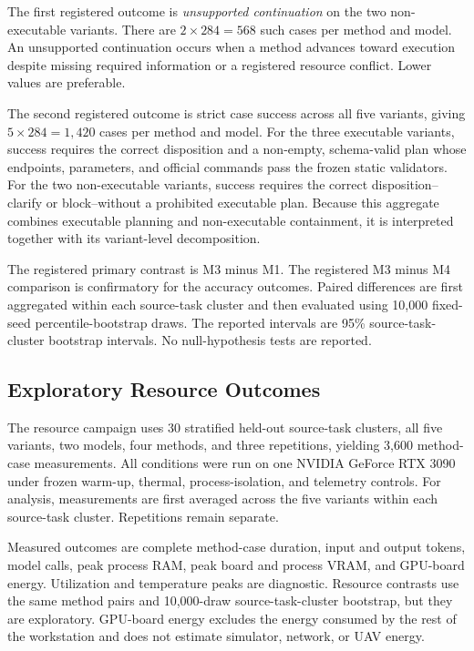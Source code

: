 \documentclass{article}
\newcommand{\Mone}{\textsc{M1}\xspace}
\newcommand{\Mthree}{\textsc{M3}\xspace}
\newcommand{\Mfour}{\textsc{M4}\xspace}
\begin{document}
The first registered outcome is \emph{unsupported continuation} on the two
non-executable variants. There are $2\times284=568$ such cases per method and
model. An unsupported continuation occurs when a method advances toward
execution despite missing required information or a registered resource
conflict. Lower values are preferable.

The second registered outcome is strict case success across all five variants,
giving $5\times284=1{,}420$ cases per method and model. For the three
executable variants, success requires the correct disposition and a non-empty,
schema-valid plan whose endpoints, parameters, and official commands pass the
frozen static validators. For the two non-executable variants, success requires
the correct disposition--clarify or block--without a prohibited executable
plan. Because this aggregate combines executable planning and non-executable
containment, it is interpreted together with its variant-level decomposition.

The registered primary contrast is \Mthree{} minus \Mone. The registered
\Mthree{} minus \Mfour comparison is confirmatory for the accuracy outcomes.
Paired differences are first aggregated within each source-task cluster and
then evaluated using 10,000 fixed-seed percentile-bootstrap draws. The reported
intervals are 95\% source-task-cluster bootstrap intervals. No
null-hypothesis tests are reported.

\subsection{Exploratory Resource Outcomes}

The resource campaign uses 30 stratified held-out source-task clusters, all
five variants, two models, four methods, and three repetitions, yielding 3,600
method-case measurements. All conditions were run on one NVIDIA GeForce RTX
3090 under frozen warm-up, thermal, process-isolation, and telemetry controls.
For analysis, measurements are first averaged across the five variants within
each source-task cluster. Repetitions remain separate.

Measured outcomes are complete method-case duration, input and output tokens,
model calls, peak process RAM, peak board and process VRAM, and GPU-board
energy. Utilization and temperature peaks are diagnostic. Resource contrasts
use the same method pairs and 10,000-draw source-task-cluster bootstrap, but
they are exploratory. GPU-board energy excludes the energy consumed by the
rest of the workstation and does not estimate simulator, network, or UAV
energy.
\end{document}
